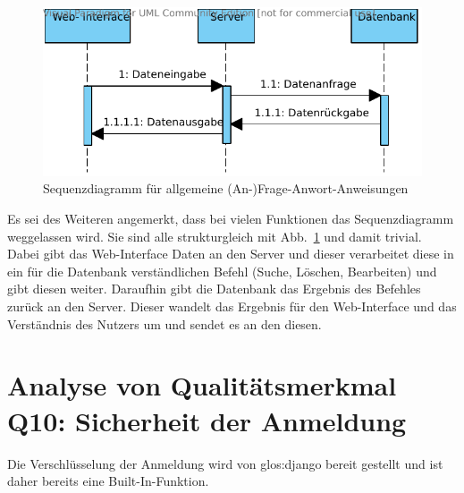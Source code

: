 \begin{figure}
    \begin{center}
        \includegraphics[width=0.8\linewidth]{bilder/frage_antwort.pdf}
        \caption{Sequenzdiagramm für allgemeine (An-)Frage-Anwort-Anweisungen}
        \label{fig:F-A}
    \end{center}
\end{figure}
Es sei des Weiteren angemerkt, dass bei vielen Funktionen das Sequenzdiagramm 
weggelassen wird. Sie sind alle strukturgleich mit Abb.\ \ref{fig:F-A} und damit
trivial. Dabei gibt das Web-Interface Daten an den Server und dieser verarbeitet 
diese in ein für die Datenbank verständlichen Befehl (Suche, Löschen, 
Bearbeiten) und gibt diesen weiter. Daraufhin gibt die Datenbank das Ergebnis 
des Befehles zurück an den Server. Dieser wandelt das Ergebnis für den 
Web-Interface und das Verständnis des Nutzers um und sendet es an den diesen.


\section{Analyse von Qualitätsmerkmal Q10: Sicherheit der Anmeldung}
Die Verschlüsselung der Anmeldung wird von \gls{glos:django} bereit gestellt und ist daher
bereits eine Built-In-Funktion. 
